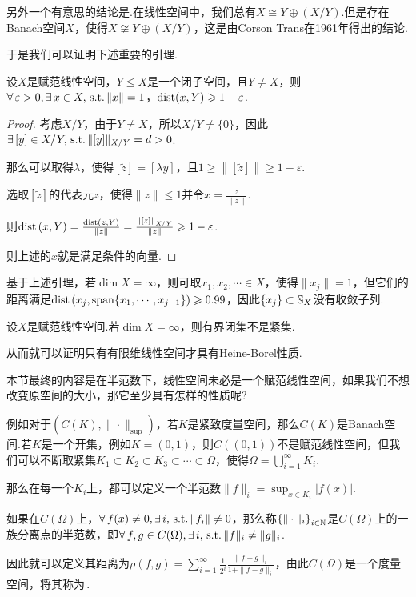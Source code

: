 另外一个有意思的结论是.在线性空间中，我们总有$X\cong Y\oplus (X/Y)$.但是存在Banach空间$X$，使得$X\not\cong Y\oplus (X/Y)$，这是由Corson Trans在1961年得出的结论.\par
于是我们可以证明下述重要的引理.
\begin{lemma}[Riesz引理]
    设$X$是赋范线性空间，$Y\leq X$是一个闭子空间，且$Y\neq X$，则$\forall\, \varepsilon>0,\exists\, x\in X,\operatorname{\,\text{s.t.}} \|x\|=1$，$\operatorname{dist}(x,Y)\geqslant 1-\varepsilon$.
\end{lemma}
\begin{proof}
    考虑$X/Y$，由于$Y\neq X$，所以$X/Y\neq \{0\}$，因此$\exists\, [y]\in X/Y,\operatorname{\,\text{s.t.}} \|[y]\|_{X/Y}=d>0$.\par
    那么可以取得$\lambda$，使得$[\tilde{z}]=[\lambda y]$，且$1\geq \left\|\left[\tilde{z}\right]\right\|\geq 1-\varepsilon$.\par
    选取$\left[\tilde{z}\right]$的代表元$z$，使得$\|z\|\leq 1$并令$x=\frac{z}{\|z\|}$.\par
    则$\operatorname{dist} \left(x,Y\right)=\frac{\operatorname{dist}(z,Y)}{\|z\|}=\frac{\left\|\left[\tilde{z}\right]\right\|_{X/Y}}{\|z\|}\geqslant 1-\varepsilon$.\par
    则上述的$x$就是满足条件的向量.
\end{proof}
基于上述引理，若$\dim X=\infty$，则可取$x_1,x_2,\cdots\in X$，使得$\|x_j\|=1$，但它们的距离满足$\operatorname{dist}\left(x_j,\operatorname{span}\{x_1,\cdots,x_{j-1}\} \right)\geqslant 0.99$，因此$\{x_j\}\subset \mathbb{S}_X$没有收敛子列.\par
\begin{corollary}[]
    设$X$是赋范线性空间.若$\dim X=\infty$，则有界闭集不是紧集.
\end{corollary}
从而就可以证明只有有限维线性空间才具有Heine-Borel性质.\par
本节最终的内容是在半范数下，线性空间未必是一个赋范线性空间，如果我们不想改变原空间的大小，那它至少具有怎样的性质呢?\par
例如对于$\left(C(K),\|\cdot\|_{\mathrm{sup}}\right)$，若$K$是紧致度量空间，那么$C(K)$是Banach空间.若$K$是一个开集，例如$K=(0,1)$，则$C((0,1))$不是赋范线性空间，但我们可以不断取紧集$K_1\subset K_2\subset K_3\subset\cdots\subset \Omega$，使得$\Omega=\bigcup_{i=1}^\infty K_i$.\par
那么在每一个$K_i$上，都可以定义一个半范数$\|f\|_{i}=\sup_{x\in K_i}|f(x)|$.\par
如果在$C(\Omega)$上，$\forall\, f(x)\neq 0,\exists\, i,\operatorname{\,\text{s.t.}} \|f_i\|\neq 0$，那么称$\left\{\|\cdot\|_i\right\}_{i\in\mathbb{N}}$是$C(\Omega)$上的一族分离点的半范数，即$\forall\, f,g\in C(\Omega),\exists\, i,\operatorname{\,\text{s.t.}} \|f\|_i\neq\|g\|_i$.\par
因此就可以定义其距离为$\rho(f,g)=\sum_{i=1}^{\infty}\frac{1}{2^i}\frac{\|f-g\|_i}{1+\|f-g\|_i}$，由此$C(\Omega)$是一个度量空间，将其称为\,.







